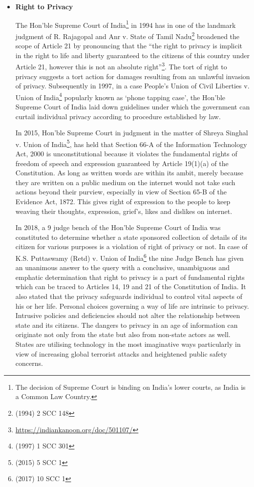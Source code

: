 \begin{multicols}{2}
\begin{itemize}
\item[{\bf 2.}]\textbf{Right to Privacy}

The Hon’ble Supreme Court of India\footnote{The decision of Supreme Court is binding on India’s lower courts, as India is a Common Law Country.} in 1994 has in one of the landmark judgment of R. Rajagopal and Anr v. State of Tamil Nadu\footnote{(1994) 2 SCC 148} broadened the scope of Article 21 by pronouncing that the “the right to privacy is implicit in the right to life and liberty guaranteed to the citizens of this country under Article 21, however this is not an absolute right”\footnote{\url{https://indiankanoon.org/doc/501107/}}. The tort of right to privacy suggests a tort action for damages  resulting from an unlawful invasion of privacy. Subsequently in 1997, in a case People’s Union of Civil Liberties v. Union of India\footnote{(1997) 1 SCC 301} popularly known as ‘phone tapping case’, the Hon’ble Supreme Court of India laid down guidelines under which the government can curtail individual privacy according to procedure established by law.

In 2015, Hon’ble Supreme Court in judgment in the matter of Shreya Singhal v. Union of India\footnote{(2015) 5 SCC 1}, has held that Section 66-A of the Information Technology Act, 2000 is unconstitutional because it violates the fundamental rights of freedom of speech and expression guaranteed by Article 19(1)(a) of the Constitution. As long as written words are within its ambit, merely because they are written on a public medium on the internet would not take such actions beyond their purview, especially in view of Section 65-B of the Evidence Act, 1872. This gives right of expression to the people to keep weaving their thoughts, expression, grief’s, likes and dislikes on internet. 

In 2018, a 9 judge bench of the Hon’ble Supreme Court of India was constituted to determine whether a state sponsored collection of details of its citizen for various purposes is a violation of right of privacy or not. In case of K.S. Puttaswamy (Retd) v. Union of India\footnote{(2017) 10 SCC 1} the nine Judge Bench has given an unanimous answer to the query with a conclusive, unambiguous and emphatic determination that right to privacy is a part of fundamental rights which can be traced to Articles 14, 19 and 21 of the Constitution of India. It also stated that the privacy safeguards individual to control vital aspects of his or her life. Personal choices governing a way of life are intrinsic to privacy. Intrusive policies and deficiencies should not alter the relationship between state and its citizens. The dangers to privacy in an age of information can originate not only from the state but also from non-state actors as well. States are utilising technology in the most imaginative ways particularly in view of increasing global terrorist attacks and heightened public safety concerns. 
\end{itemize}


\end{multicols}
